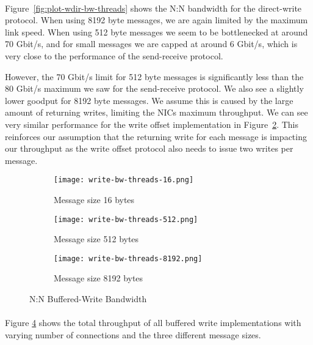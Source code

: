 \paragraph{} Figure~\ref{fig:plot-wdir-bw-threads} shows the N:N bandwidth for the direct-write protocol. When using 8192 
byte messages, we are again limited by the maximum link speed. When using 512 byte messages we seem to be bottlenecked at around 
70 Gbit/s, and for small messages we are capped at around 6 Gbit/s, which is very close to the performance of the send-receive
protocol.

However, the 70 Gbit/s limit for 512 byte messages is significantly less than the 80 Gbit/s maximum we saw for the
send-receive protocol. We also see a slightly lower goodput for 8192 byte messages. We assume this is caused by the 
large amount of returning writes, limiting the NICs maximum throughput. We can see very similar performance for the
write offset implementation in Figure~\ref{fig:plot-write-bw-thread-512}. This reinforces our assumption that the returning write
for each message is impacting our throughput as the write offset protocol also needs to issue two writes per message.




\begin{figure}[ht]
  \centering
\begin{subfigure}[b]{0.49\textwidth}
  \centering
  \texttt{[image: write-bw-threads-16.png]}
  \caption{Message size 16 bytes}
  \label{fig:plot-write-bw-thread-16}
\end{subfigure}
\begin{subfigure}[b]{0.49\textwidth}
  \centering
  \texttt{[image: write-bw-threads-512.png]}
  \caption{Message size 512 bytes}
  \label{fig:plot-write-bw-thread-512}
\end{subfigure}
\begin{subfigure}[b]{0.49\textwidth}
  \centering
  \texttt{[image: write-bw-threads-8192.png]}
  \caption{Message size 8192 bytes}
  \label{fig:plot-write-bw-thread-8192}
\end{subfigure}
  \caption{N:N Buffered-Write Bandwidth}
  \label{fig:plot-write-bw-thread}
\end{figure}


\paragraph{} Figure \ref{fig:plot-write-bw-thread} shows the total throughput of all buffered write implementations
with varying number of connections and the three different message sizes.

